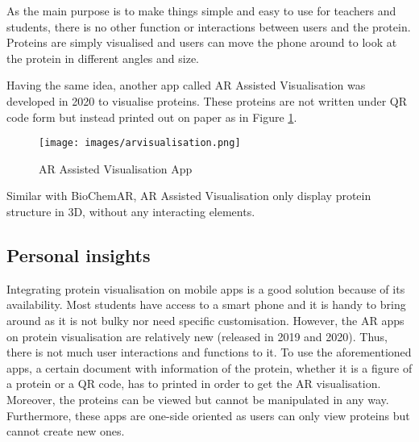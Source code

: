 As the main purpose is to make things simple and easy to use for teachers and students, there is no other function or interactions between users and the protein. Proteins are simply visualised and users can move the phone around to look at the protein in different angles and size. 

Having the same idea, another app called  AR Assisted Visualisation
was developed in 2020 to visualise proteins. These proteins are not written under QR code form but instead printed out on paper as in Figure \ref{fig:arvisualisation}. 

\begin{figure}[!htbp]
	\centering
	\texttt{[image: images/arvisualisation.png]}
	\caption{AR Assisted Visualisation App \parencite{eriksen_visualizing_2020}}
	\label{fig:arvisualisation}
\end{figure}

Similar with BioChemAR, AR Assisted Visualisation only display protein structure in 3D, without any interacting elements. 

\subsection{Personal insights}
Integrating protein visualisation on mobile apps is a good solution because of its availability. Most students have access to a smart phone and it is handy to bring around as it is not bulky nor need specific customisation.
However, the AR apps on protein visualisation are relatively new (released in 2019 and 2020). Thus, there is not much user interactions and functions to it. To use the aforementioned apps, a certain document with information of the protein, whether it is a figure of a protein or a QR code, has to printed in order to get the AR visualisation. Moreover, the proteins can be viewed but cannot be manipulated in any way. Furthermore, these apps are one-side oriented as users can only view proteins but cannot create new ones.

